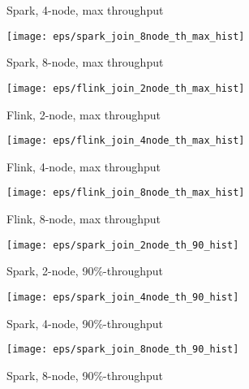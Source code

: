 {\begin{figure*}
\begin{subfigure}[b]{0.3\textwidth}
       \caption{Spark, 4-node, max  throughput }
                       \label{fig_spark_join_4node_max}
   \end{subfigure}%
   \begin{subfigure}[b]{0.3\textwidth}
       \texttt{[image: eps/spark\_join\_8node\_th\_max\_hist]}

       \caption{Spark, 8-node, max  throughput }
                       \label{fig_spark_join_8node_max}
   \end{subfigure}




   \begin{subfigure}[b]{0.3\textwidth}
       \texttt{[image: eps/flink\_join\_2node\_th\_max\_hist]}

       \caption{Flink, 2-node, max  throughput}
   \end{subfigure}%
   \begin{subfigure}[b]{0.3\textwidth}
       \texttt{[image: eps/flink\_join\_4node\_th\_max\_hist]}

       \caption{Flink, 4-node, max  throughput }
   \end{subfigure}%
   \begin{subfigure}[b]{0.3\textwidth}
       \texttt{[image: eps/flink\_join\_8node\_th\_max\_hist]}

       \caption{Flink, 8-node, max  throughput }
   \end{subfigure}
   
   
   
   
      \begin{subfigure}[b]{0.3\textwidth}
       \texttt{[image: eps/spark\_join\_2node\_th\_90\_hist]}

       \caption{Spark, 2-node,  90\%-throughput}
   \end{subfigure}%
   \begin{subfigure}[b]{0.3\textwidth}
       \texttt{[image: eps/spark\_join\_4node\_th\_90\_hist]}

       \caption{Spark, 4-node,  90\%-throughput }
   \end{subfigure}%
   \begin{subfigure}[b]{0.3\textwidth}
       \texttt{[image: eps/spark\_join\_8node\_th\_90\_hist]}

       \caption{Spark, 8-node,  90\%-throughput }
   \end{subfigure}





\end{figure*}}
